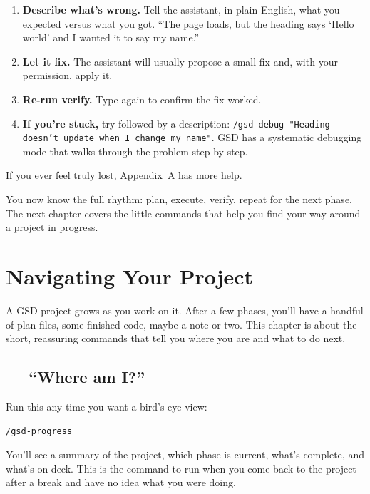 \documentclass[11pt,letterpaper,openany]{book}
\begin{document}
\begin{enumerate}
  \item \textbf{Describe what's wrong.} Tell the assistant, in plain
        English, what you expected versus what you got. ``The page
        loads, but the heading says `Hello world' and I wanted it to
        say my name.''
  \item \textbf{Let it fix.} The assistant will usually propose a
        small fix and, with your permission, apply it.
  \item \textbf{Re-run verify.} Type  again to
        confirm the fix worked.
  \item \textbf{If you're stuck,} try  followed by a
        description: \texttt{/gsd-debug "Heading doesn't update when
        I change my name"}. GSD has a systematic debugging mode that
        walks through the problem step by step.
\end{enumerate}

If you ever feel truly lost, Appendix~A has more help.

\bigskip
\noindent You now know the full rhythm: plan, execute, verify, repeat
for the next phase. The next chapter covers the little commands that
help you find your way around a project in progress.

\chapter{Navigating Your Project}

A GSD project grows as you work on it. After a few phases, you'll have
a handful of plan files, some finished code, maybe a note or two. This
chapter is about the short, reassuring commands that tell you where
you are and what to do next.

\section{\texorpdfstring{}{/gsd-progress} --- ``Where am I?''}

Run this any time you want a bird's-eye view:

\begin{lstlisting}
/gsd-progress
\end{lstlisting}

You'll see a summary of the project, which phase is current, what's
complete, and what's on deck. This is the command to run when you
come back to the project after a break and have no idea what you
were doing.
\end{document}
